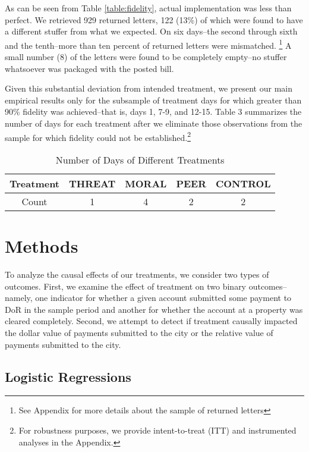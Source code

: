 \documentclass[12pt,titlepage]{article}
\begin{document}
As can be seen from Table \ref{table:fidelity}, actual implementation
was less than perfect. We retrieved 929 returned letters, 122 (13\%)
of which were found to have a different stuffer from what we
expected. On six days--the second through sixth and the tenth--more
than ten percent of returned letters were mismatched.
\footnote{See Appendix for more details about the sample of returned letters}
A small number (8) of the letters were found to be completely empty--no
stuffer whatsoever was packaged with the posted bill. 

Given this substantial deviation from intended treatment, we present
our main empirical results only for the subsample of treatment days
for which greater than 90\% fidelity was achieved--that is, days 1,
7-9, and 12-15. Table 3 summarizes the number of days for each
treatment after we eliminate those observations from the sample for
which fidelity could not be established.\footnote{For robustness
  purposes, we provide intent-to-treat (ITT) and instrumented analyses
  in the Appendix.}

\begin{table}[htbp]
\caption{Number of Days of Different Treatments}
\begin{center}
\begin{tabular}{|c|c|c|c|c|}
\hline 
Treatment & THREAT & MORAL & PEER & CONTROL\tabularnewline
\hline 
Count & 1 & 4 & 2 & 2\tabularnewline
\hline 
\end{tabular}
\par\end{center}
\end{table}

\section{Methods}

To analyze the causal effects of our treatments, we consider two types of outcomes.
First, we examine the
effect of treatment on two binary outcomes--namely, one indicator for
whether a given account submitted some payment to DoR in the sample
period and another for whether the account at a property was cleared
completely. Second, we attempt to detect if treatment causally
impacted the dollar value of payments submitted to the city or the
relative value of payments submitted to the city.  

\subsection{Logistic Regressions}
\end{document}
